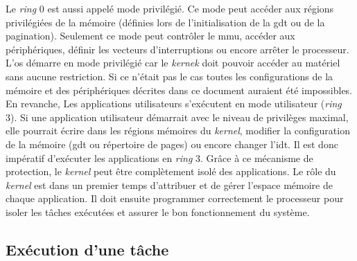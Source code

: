 Le \textit{ring} 0 est aussi appelé mode privilégié. Ce mode peut accéder aux régions
privilégiées de la mémoire (définies lors de l'initialisation de la \acrshort{gdt}
ou de la pagination). Seulement ce mode peut contrôler le \acrshort{mmu}, accéder
aux périphériques, définir les vecteurs d'interruptions ou encore arrêter le
processeur. L'\acrshort{os} démarre en mode privilégié car le \textit{kernek} doit
pouvoir accéder au matériel sans aucune restriction. Si ce n'était pas le cas toutes
les configurations de la mémoire et des périphériques décrites dans ce document
auraient été impossibles. En revanche, Les applications utilisateurs s'exécutent
en mode utilisateur (\textit{ring} 3). Si une application utilisateur démarrait
avec le niveau de privilèges maximal, elle pourrait écrire dans les régions mémoires
du \textit{kernel}, modifier la configuration de la mémoire (\acrshort{gdt} ou 
répertoire de pages) ou encore changer l'\acrshort{idt}. Il est donc impératif
d'exécuter les applications en \textit{ring} 3. Grâce à ce mécanisme de protection,
le \textit{kernel} peut être complètement isolé des applications. Le rôle du \textit{kernel}
est dans un premier temps d'attribuer et de gérer l'espace mémoire de chaque application.
Il doit ensuite programmer correctement le processeur pour isoler les tâches exécutées
et assurer le bon fonctionnement du système.


\subsection{Exécution d'une tâche}
